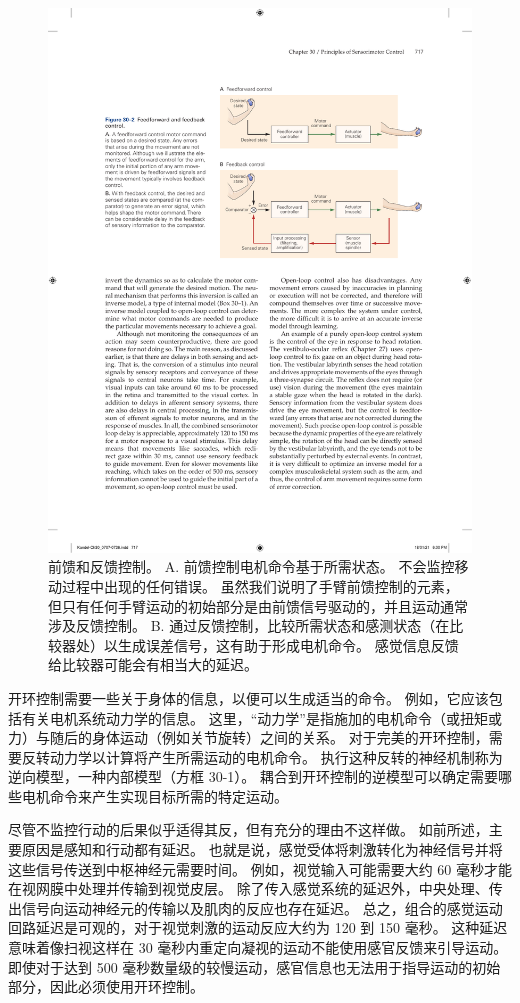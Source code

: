 \begin{figure}[htbp]
	\centering
	\includegraphics[width=0.65\linewidth]{chap30/fig_30_2}
	\caption{前馈和反馈控制。 A. 前馈控制电机命令基于所需状态。 不会监控移动过程中出现的任何错误。 虽然我们说明了手臂前馈控制的元素，但只有任何手臂运动的初始部分是由前馈信号驱动的，并且运动通常涉及反馈控制。 B. 通过反馈控制，比较所需状态和感测状态（在比较器处）以生成误差信号，这有助于形成电机命令。 感觉信息反馈给比较器可能会有相当大的延迟。}
	\label{fig:30_2}
\end{figure}

开环控制需要一些关于身体的信息，以便可以生成适当的命令。 例如，它应该包括有关电机系统动力学的信息。 这里，“动力学”是指施加的电机命令（或扭矩或力）与随后的身体运动（例如关节旋转）之间的关系。 对于完美的开环控制，需要反转动力学以计算将产生所需运动的电机命令。 执行这种反转的神经机制称为逆向模型，一种内部模型（方框 30-1）。 耦合到开环控制的逆模型可以确定需要哪些电机命令来产生实现目标所需的特定运动。

尽管不监控行动的后果似乎适得其反，但有充分的理由不这样做。 如前所述，主要原因是感知和行动都有延迟。 也就是说，感觉受体将刺激转化为神经信号并将这些信号传送到中枢神经元需要时间。 例如，视觉输入可能需要大约 60 毫秒才能在视网膜中处理并传输到视觉皮层。 除了传入感觉系统的延迟外，中央处理、传出信号向运动神经元的传输以及肌肉的反应也存在延迟。 总之，组合的感觉运动回路延迟是可观的，对于视觉刺激的运动反应大约为 120 到 150 毫秒。 这种延迟意味着像扫视这样在 30 毫秒内重定向凝视的运动不能使用感官反馈来引导运动。 即使对于达到 500 毫秒数量级的较慢运动，感官信息也无法用于指导运动的初始部分，因此必须使用开环控制。

